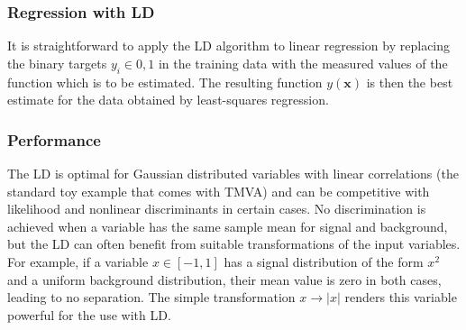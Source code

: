 \subsubsection{Regression with LD}

It is straightforward to apply the LD algorithm to linear regression by replacing the 
binary targets $y_i \in {0,1}$ in the training data with the measured values of the 
function which is to be estimated. The resulting function $y(\mathbf{x})$ is then 
the best estimate for the data obtained by least-squares regression.

\subsubsection{Performance}

The LD is optimal for Gaussian distributed variables with linear correlations (\cf the 
standard toy example that comes with TMVA) and can be competitive with likelihood and 
nonlinear discriminants in certain cases. No discrimination is achieved when a variable 
has the same sample mean for signal and background, but the LD can often benefit from 
suitable transformations of the input variables. For example, if a variable 
$x \in [-1,1]$ has a signal distribution of the form $x^2$ and a uniform background 
distribution, their mean value is zero in both cases, leading to no separation. The 
simple transformation $x \rightarrow |x|$ renders this variable powerful for the use 
with LD.

